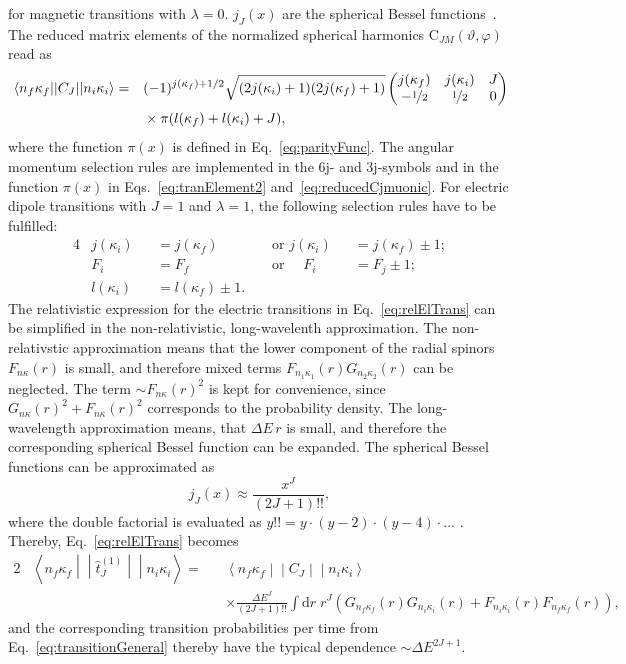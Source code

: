 for magnetic transitions with $\lambda = 0$. $j_J(x)$ are the spherical Bessel functions~\cite[Eq. 10.47.3]{NIST:DLMF}.
The reduced matrix elements of the normalized spherical harmonics $\text{C}_{JM}(\vartheta,\varphi)$ read as~\cite{johnson2007}
\begin{alignat}{2}
&\left<n_f\kappa_f\middle|\middle|C_J\middle|\middle|n_i\kappa_i\right>=&&(-1)^{j(\kappa_f)+1/2}\sqrt{(2j(\kappa_i)+1)(2j(\kappa_f)+1)}
\begin{pmatrix}
j(\kappa_f)&j(\kappa_i)&J\\
-\nicefrac{1}{2}&\nicefrac{1}{2}&0
\end{pmatrix}
\notag\\
&&&\times\pi(l(\kappa_f)+l(\kappa_i)+J),
\label{eq:reducedCjmuonic}
\end{alignat}
where the function $\pi(x)$ is defined in Eq.~\eqref{eq:parityFunc}. The angular momentum selection rules are implemented in the 6j- and 3j-symbols and in the function $\pi(x)$ in Eqs.~\eqref{eq:tranElement2} and~\eqref{eq:reducedCjmuonic}. For electric dipole transitions with $J=1$ and $\lambda=1$, the following selection rules have to be fulfilled:
\begin{alignat}{4}
&j(\kappa_i)&&=j(\kappa_f) &&\text{ or } j(\kappa_i)&&=j(\kappa_f)\pm 1;\\
&F_i &&= F_f &&\text{ or }\quad F_i&&=F_j\pm 1;\\
&l(\kappa_i)&&=l(\kappa_f)\pm 1.
\label{eq:dipoleSelectionRules}
\end{alignat}
The relativistic expression for the electric transitions in Eq.~\eqref{eq:relElTrans} can be simplified in the non-relativistic, long-wavelenth approximation. The non-relativstic approximation means that the lower component of the radial spinors $F_{n\kappa}(r)$ is small, and therefore mixed terms $F_{n_1\kappa_1}(r)G_{n_2\kappa_2}(r)$ can be neglected. The term $\sim F_{n\kappa}(r)^2$ is kept for convenience, since $G_{n\kappa}(r)^2+F_{n\kappa}(r)^2$ corresponds to the probability density. The long-wavelength approximation means, that $\Delta E \, r$ is small, and therefore the corresponding spherical Bessel function can be expanded. The spherical Bessel functions can be approximated as
\begin{equation}
j_J(x)\approx \frac{x^J}{(2J+1)!!},
\end{equation}
where the double factorial is evaluated as $y!! = y \cdot (y-2) \cdot (y-4) \cdot ...\,\,$. Thereby, Eq.~\eqref{eq:relElTrans} becomes
\begin{alignat}{2}
\label{eq:relElTransNR}
&\left< n_{f}\kappa_{f}\middle|\middle|\hat{t}^{(1)}_{J}\middle|\middle|n_{i}\kappa_{i}\right>=&&
\left<n_f\kappa_f\middle|\middle|C_J\middle|\middle|n_i\kappa_i\right>\\
&&&\times\frac{\Delta E^J}{(2J+1)!!}\int\text{d}r \;r^J\left(G_{n_f\kappa_f}(r)G_{n_i\kappa_i}(r)+F_{n_i\kappa_i}(r)F_{n_f\kappa_f}(r)\right),
\end{alignat}
and the corresponding transition probabilities per time from Eq.~\eqref{eq:transitionGeneral} thereby have the typical dependence $\sim \Delta E ^{2J+1}$.\\


